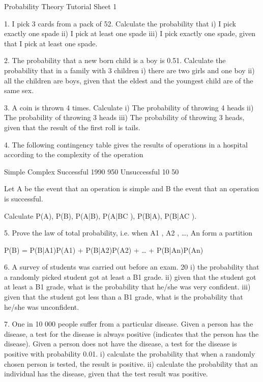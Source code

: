 \documentclass[]{report}
\begin{document}
	
	Probability Theory
	Tutorial Sheet 1
	
	1.	I pick 3 cards from a pack of 52. Calculate the probability that 
	i)	I pick exactly one spade
	ii)	I pick at least one spade
	iii)	I pick exactly one spade, given that I pick at least one spade.
	
	2.	The probability that a new born child is a boy is 0.51. Calculate the probability that in a family with 3 children
	i)	there are two girls and one boy
	ii)	all the children are boys, given that the eldest and the youngest child are of the same sex.
	
	3.	A coin is thrown 4 times. Calculate 
	i)	The probability of throwing 4 heads
	ii)	The probability of throwing 3 heads 
	iii)	The probability of throwing 3 heads, given that the result of the first roll is tails.
	
	4.	The following contingency table gives the results of operations in a hospital according to the complexity of the operation
	
	Simple	Complex
	Successful	1990	950
	Unsuccessful	10	50
	
	Let A be the event that an operation is simple and B the event that an operation is successful. 
	
	Calculate P(A), P(B), P(A|B), P(A|BC ), P(B|A), P(B|AC ).
	
	5. Prove the law of total probability, i.e. when A1 , A2 , …, An form a partition
	
	P(B) = P(B|A1)P(A1) + P(B|A2)P(A2) + … + P(B|An)P(An)
	
	6. A survey of students was carried out before an exam. 20%
	i)	the probability that a randomly picked student  got at least a B1 grade.
	ii)	given that the student got at least a B1 grade, what is the probability that he/she was very confident.
	iii)	given that the student got less than a B1 grade, what is the probability that he/she was unconfident.
	
	
	
	
	7. One in 10 000 people suffer from a particular disease. Given a person has the disease, a test for the disease is always positive (indicates that the person has the disease). Given a person does not have the disease, a test for the disease is positive with probability 0.01.
	i) calculate the probability that when a randomly chosen person is tested, the result is positive. 
	ii) calculate the probability that an individual has the disease, given that the test result was positive.
	
\end{document}
